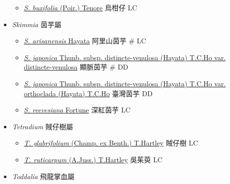 \begin{itemize}
  \begin{itemize}
        \item[] \href{http://www.theplantlist.org/tpl1.1/search?q=Severinia+buxifolia}{\textit{S. buxifolia} (Poir.) Tenore}   烏柑仔   LC
  \end{itemize}
 \item[] \textit{Skimmia} 茵芋屬
                                
  \begin{itemize}
        \item[] \href{http://www.theplantlist.org/tpl1.1/search?q=Skimmia+arisanensis}{\textit{S. arisanensis} Hayata}   阿里山茵芋  \# LC
        \item[] \href{http://www.theplantlist.org/tpl1.1/search?q=Skimmia+japonica+subsp.+distincte-venulosa+var.+distincte-venulosa}{\textit{S. japonica} Thunb. subsp. distincte-venulosa (Hayata) T.C.Ho var. distincte-venulosa}   顯脈茵芋  \# DD
        \item[] \href{http://www.theplantlist.org/tpl1.1/search?q=Skimmia+japonica+subsp.+distincte-venulosa+var.+orthoclada}{\textit{S. japonica} Thunb. subsp. distincte-venulosa (Hayata) T.C.Ho var. orthoclada (Hayata) T.C.Ho}   臺灣茵芋   DD
        \item[] \href{http://www.theplantlist.org/tpl1.1/search?q=Skimmia+reevesiana}{\textit{S. reevesiana} Fortune}   深紅茵芋   LC
  \end{itemize}
 \item[] \textit{Tetradium} 賊仔樹屬
                                
  \begin{itemize}
        \item[] \href{http://www.theplantlist.org/tpl1.1/search?q=Tetradium+glabrifolium}{\textit{T. glabrifolium} (Champ. ex Benth.) T.Hartley}   賊仔樹   LC
        \item[] \href{http://www.theplantlist.org/tpl1.1/search?q=Tetradium+ruticarpum}{\textit{T. ruticarpum} (A.Juss.) T.Hartley}   吳茱萸   LC
  \end{itemize}
 \item[] \textit{Toddalia} 飛龍掌血屬
                                

\end{itemize}
